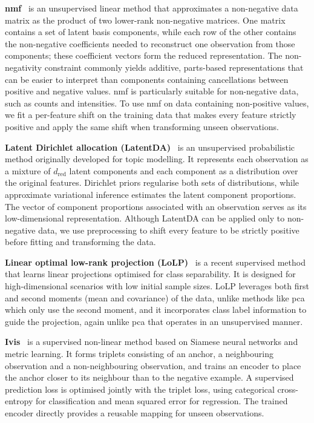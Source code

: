     \noindent \textbf{\Gls{nmf}}~\citep{LeeSeu00} is an unsupervised linear method that approximates a non-negative data matrix as the product of two lower-rank non-negative matrices. One matrix contains a set of latent basis components, while each row of the other contains the non-negative coefficients needed to reconstruct one observation from those components; these coefficient vectors form the reduced representation. The non-negativity constraint commonly yields additive, parts-based representations that can be easier to interpret than components containing cancellations between positive and negative values. \gls{nmf} is particularly suitable for non-negative data, such as counts and intensities. To use \gls{nmf} on data containing non-positive values, we fit a per-feature shift on the training data that makes every feature strictly positive and apply the same shift when transforming unseen observations.

    \noindent \textbf{Latent Dirichlet allocation (LatentDA)}~\citep{BleEtAl03} is an unsupervised probabilistic method originally developed for topic modelling. It represents each observation as a mixture of $d_{\mathrm{red}}$ latent components and each component as a distribution over the original features. Dirichlet priors regularise both sets of distributions, while approximate variational inference estimates the latent component proportions. The vector of component proportions associated with an observation serves as its low-dimensional representation. Although LatentDA can be applied only to non-negative data, we use preprocessing to shift every feature to be strictly positive before fitting and transforming the data.

    \noindent \textbf{Linear optimal low-rank projection (LoLP)}~\citep{VogEtAl21} is a recent supervised method that learns linear projections optimised for class separability. It is designed for high-dimensional scenarios with low initial sample sizes. LoLP leverages both first and second moments (mean and covariance) of the data, unlike methods like \gls{pca} which only use the second moment, and it incorporates class label information to guide the projection, again unlike \gls{pca} that operates in an unsupervised manner.

    \noindent \textbf{Ivis}~\citep{SzuEtAl19} is a supervised non-linear method based on Siamese neural networks and metric learning. It forms triplets consisting of an anchor, a neighbouring observation and a non-neighbouring observation, and trains an encoder to place the anchor closer to its neighbour than to the negative example. A supervised prediction loss is optimised jointly with the triplet loss, using categorical cross-entropy for classification and mean squared error for regression. The trained encoder directly provides a reusable mapping for unseen observations.

